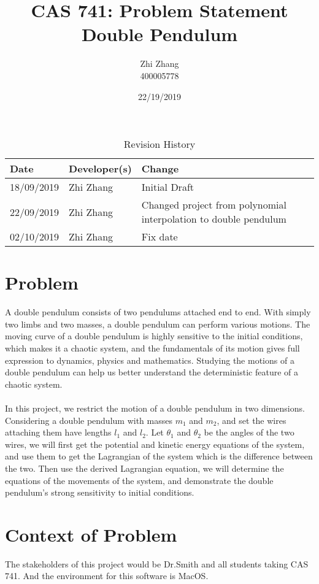\documentclass{article}
\title{CAS 741: Problem Statement\\Double Pendulum}
\author{Zhi Zhang\\400005778}
\date{22/19/2019}
\begin{document}
\maketitle
\begin{table}[hp]
\caption{Revision History} \label{TblRevisionHistory}
\begin{tabularx}{\textwidth}{llX}
\toprule
\textbf{Date} & \textbf{Developer(s)} & \textbf{Change}\\
\midrule
18/09/2019 & Zhi Zhang & Initial Draft\\
22/09/2019 & Zhi Zhang & Changed project from polynomial interpolation to double pendulum\\
02/10/2019 & Zhi Zhang & Fix date\\
\bottomrule
\end{tabularx}
\end{table}

\section{Problem}
A double pendulum consists of two pendulums attached end to end. With simply two limbs and two masses, a double pendulum can perform various motions. The moving curve of a double pendulum is highly sensitive to the initial conditions, which makes it a chaotic system, and the fundamentals of its motion gives full expression to dynamics, physics and mathematics. Studying the motions of a double pendulum can help us better understand the deterministic feature of a chaotic system.\\\\
In this project, we restrict the motion of a double pendulum in two dimensions. Considering a double pendulum with masses $\mathit{m_{1}}$ and $\mathit{m_{2}}$, and set the wires attaching them have lengths $\mathit{l_{1}}$ and $\mathit{l_{2}}$. Let $\mathit{\theta_{1}}$ and $\mathit{\theta_{2}}$ be the angles of the two wires, we will first get the potential and kinetic energy equations of the system, and use them to get the Lagrangian of the system which is the difference between the two. Then use the derived Lagrangian equation, we will determine the equations of the movements of the system, and demonstrate the double pendulum's strong sensitivity to initial conditions. 
 
\section{Context of Problem}
The stakeholders of this project would be Dr.Smith and all students taking CAS 741. And the environment for this software is MacOS.
 
\end{document}
